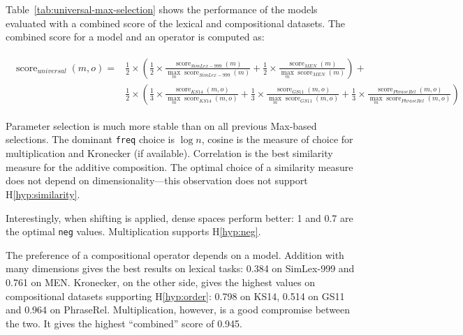 Table~\ref{tab:universal-max-selection} shows the performance of the models evaluated with a combined score of the lexical and compositional datasets. The combined score for a model and an operator is computed as:

{\scriptsize
  \begin{align}
    \begin{split}
\operatorname{score}_\mathit{universal}(\mathit{m}, \mathit{o}) = & %
\frac{1}{2}\times\left(
\frac{1}{2}\times%
\frac{\operatorname{score}_\mathit{SimLex-999}(\mathit{m})}%
{\max_m\operatorname{score}_\mathit{SimLex-999}(m)}%
+%
\frac{1}{2}\times%
\frac{\operatorname{score}_\mathit{MEN}(\mathit{m})}%
{\max_m\operatorname{score}_\mathit{MEN}(m)}%
\right) +
\\
&\frac{1}{2}\times\left(
\frac{1}{3}\times%
\frac{\operatorname{score}_\mathit{KS14}(\mathit{m}, \mathit{o})}%
{\max_m\operatorname{score}_\mathit{KS14}(m, \mathit{o})}%
+%
\frac{1}{3}\times%
\frac{\operatorname{score}_\mathit{GS11}(\mathit{m}, \mathit{o})}%
{\max_m\operatorname{score}_\mathit{GS11}(m, \mathit{o})}%
+%
\frac{1}{3}\times%
\frac{\operatorname{score}_\mathit{PhraseRel}(\mathit{m, \mathit{o}})}%
{\max_m\operatorname{score}_\mathit{PhraseRel}(m, \mathit{o})}%
\right)
\end{split}
\end{align}
}

Parameter selection is much more stable than on all previous Max-based selections. The dominant \texttt{freq} choice is $\log n$, cosine is the measure of choice for multiplication and Kronecker (if available). Correlation is the best similarity measure for the additive composition. The optimal choice of a similarity measure does not depend on dimensionality---this observation does not support H\ref{hyp:similarity}.

Interestingly, when shifting is applied, dense spaces perform better: 1 and 0.7 are the optimal \texttt{neg} values. Multiplication  supports H\ref{hyp:neg}.

The preference of a compositional operator depends on a model. Addition with many dimensions gives the best results on lexical tasks: 0.384 on SimLex-999 and 0.761 on MEN. Kronecker, on the other side, gives the highest values on compositional datasets supporting H\ref{hyp:order}: 0.798 on KS14, 0.514 on GS11 and 0.964 on PhraseRel. Multiplication, however, is a good compromise between the two. It gives the highest ``combined'' score of 0.945.

